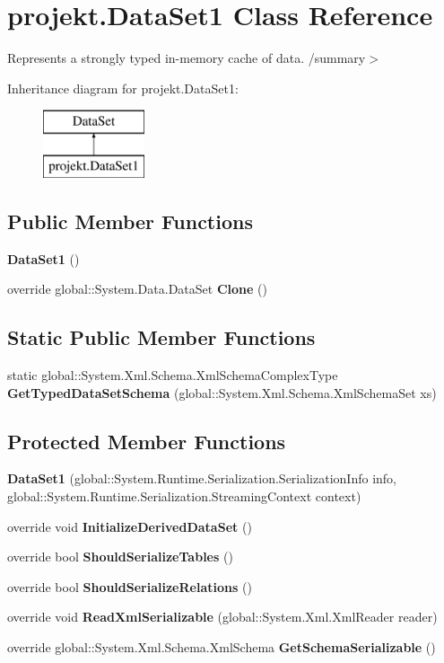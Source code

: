 \section{projekt.\+Data\+Set1 Class Reference}
\label{classprojekt_1_1DataSet1}


Represents a strongly typed in-\/memory cache of data. /summary$>$  


Inheritance diagram for projekt.\+Data\+Set1\+:\begin{figure}[H]
\begin{center}
\leavevmode
\includegraphics[height=2.000000cm]{classprojekt_1_1DataSet1}
\end{center}
\end{figure}
\subsection*{Public Member Functions}
\begin{DoxyCompactItemize}
\item 
\textbf{ Data\+Set1} ()
\item 
override global\+::\+System.\+Data.\+Data\+Set \textbf{ Clone} ()
\end{DoxyCompactItemize}
\subsection*{Static Public Member Functions}
\begin{DoxyCompactItemize}
\item 
static global\+::\+System.\+Xml.\+Schema.\+Xml\+Schema\+Complex\+Type \textbf{ Get\+Typed\+Data\+Set\+Schema} (global\+::\+System.\+Xml.\+Schema.\+Xml\+Schema\+Set xs)
\end{DoxyCompactItemize}
\subsection*{Protected Member Functions}
\begin{DoxyCompactItemize}
\item 
\textbf{ Data\+Set1} (global\+::\+System.\+Runtime.\+Serialization.\+Serialization\+Info info, global\+::\+System.\+Runtime.\+Serialization.\+Streaming\+Context context)
\item 
override void \textbf{ Initialize\+Derived\+Data\+Set} ()
\item 
override bool \textbf{ Should\+Serialize\+Tables} ()
\item 
override bool \textbf{ Should\+Serialize\+Relations} ()
\item 
override void \textbf{ Read\+Xml\+Serializable} (global\+::\+System.\+Xml.\+Xml\+Reader reader)
\item 
override global\+::\+System.\+Xml.\+Schema.\+Xml\+Schema \textbf{ Get\+Schema\+Serializable} ()
\end{DoxyCompactItemize}
